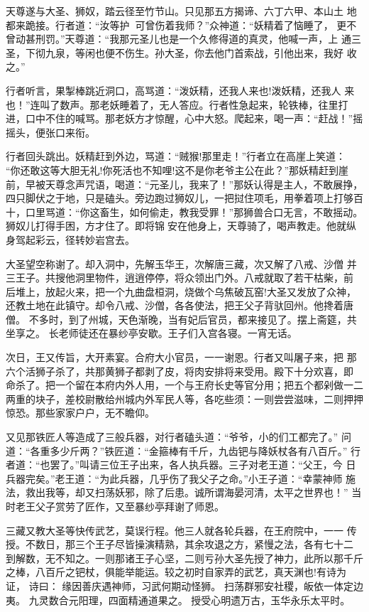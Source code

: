 天尊遂与大圣、狮奴，踏云径至竹节山。只见那五方揭谛、六丁六甲、本山土
地都来跪接。行者道：“汝等护，可曾伤着我师？”众神道：“妖精着了恼睡了，
更不曾动甚刑罚。”天尊道：“我那元圣儿也是一个久修得道的真灵，他喊一声，上
通三圣，下彻九泉，等闲也便不伤生。孙大圣，你去他门首索战，引他出来，我好
收之。”

行者听言，果掣棒跳近洞口，高骂道：“泼妖精，还我人来也!泼妖精，还我人
来也！”连叫了数声。那老妖睡着了，无人答应。行者性急起来，轮铁棒，往里打
进，口中不住的喊骂。那老妖方才惊醒，心中大怒。爬起来，喝一声：“赶战！”摇
摇头，便张口来衔。

行者回头跳出。妖精赶到外边，骂道：“贼猴!那里走！”行者立在高崖上笑道：
“你还敢这等大胆无礼!你死活也不知哩!这不是你老爷主公在此？”那妖精赶到崖
前，早被天尊念声咒语，喝道：“元圣儿，我来了！”那妖认得是主人，不敢展挣，
四只脚伏之于地，只是磕头。旁边跑过狮奴儿，一把挝住项毛，用拳着项上打够百
十，口里骂道：“你这畜生，如何偷走，教我受罪！”那狮兽合口无言，不敢摇动。
狮奴儿打得手困，方才住了。即将锦安在他身上，天尊骑了，喝声教走。他就纵
身驾起彩云，径转妙岩宫去。

大圣望空称谢了。却入洞中，先解玉华王，次解唐三藏，次又解了八戒、沙僧
并三王子。共搜他洞里物件，逍逍停停，将众领出门外。八戒就取了若干枯柴，前
后堆上，放起火来，把一个九曲盘桓洞，烧做个乌焦破瓦窑!大圣又发放了众神，
还教土地在此镇守。却令八戒、沙僧，各各使法，把王父子背驮回州。他搀着唐僧。
不多时，到了州城，天色渐晚，当有妃后官员，都来接见了。摆上斋筵，共坐享之。
长老师徒还在暴纱亭安歇。王子们入宫各寝。一宵无话。

次日，王又传旨，大开素宴。合府大小官员，一一谢恩。行者又叫屠子来，把
那六个活狮子杀了，共那黄狮子都剥了皮，将肉安排将来受用。殿下十分欢喜，即
命杀了。把一个留在本府内外人用，一个与王府长史等官分用；把五个都剁做一二
两重的块子，差校尉散给州城内外军民人等，各吃些须：一则尝尝滋味，二则押押
惊恐。那些家家户户，无不瞻仰。

又见那铁匠人等造成了三般兵器，对行者磕头道：“爷爷，小的们工都完了。”
问道：“各重多少斤两？”铁匠道：“金箍棒有千斤，九齿钯与降妖杖各有八百斤。”
行者道：“也罢了。”叫请三位王子出来，各人执兵器。三子对老王道：“父王，今
日兵器完矣。”老王道：“为此兵器，几乎伤了我父子之命。”小王子道：“幸蒙神师
施法，救出我等，却又扫荡妖邪，除了后患。诚所谓海晏河清，太平之世界也！”
当时老王父子赏劳了匠作，又至暴纱亭拜谢了师恩。

三藏又教大圣等快传武艺，莫误行程。他三人就各轮兵器，在王府院中，一一
传授。不数日，那三个王子尽皆操演精熟，其余攻退之方，紧慢之法，各有七十二
到解数，无不知之。一则那诸王子心坚，二则亏孙大圣先授了神力，此所以那千斤
之棒，八百斤之钯杖，俱能举能运。较之初时自家弄的武艺，真天渊也!有诗为证，
诗曰：
缘因善庆遇神师，习武何期动怪狮。
扫荡群邪安社稷，皈依一体定边夷。
九灵数合元阳理，四面精通道果之。
授受心明遗万古，玉华永乐太平时。

